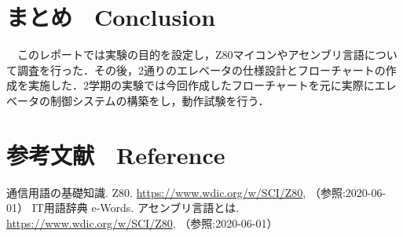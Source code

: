 \section{まとめ　Conclusion}
　このレポートでは実験の目的を設定し，Z80マイコンやアセンブリ言語について調査を行った．その後，2通りのエレベータの仕様設計とフローチャートの作成を実施した．2学期の実験では今回作成したフローチャートを元に実際にエレベータの制御システムの構築をし，動作試験を行う．


\section{参考文献　Reference}
\begin{thebibliography}{9}
     通信用語の基礎知識. Z80. \url{https://www.wdic.org/w/SCI/Z80}, （参照:2020-06-01）
     IT用語辞典 e-Words. アセンブリ言語とは. \url{https://www.wdic.org/w/SCI/Z80}, （参照:2020-06-01）
\end{thebibliography}




